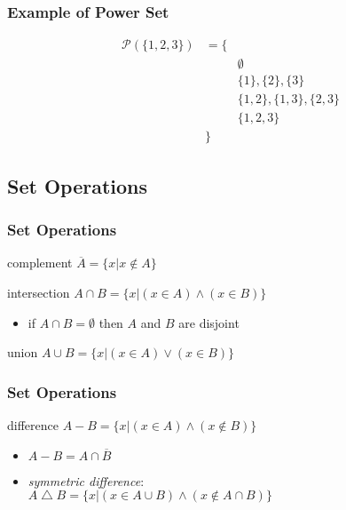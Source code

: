 \documentclass[dvipsnames]{beamer}
\begin{document}
\begin{frame}
  \frametitle{Example of Power Set}

  \begin{example}
    \begin{eqnarray*}
      \mathcal{P}(\{1,2,3\}) & = \{ &\\
                             &      & \emptyset\\
                             &      & \{1\},\{2\},\{3\}\\
                             &      & \{1,2\},\{1,3\},\{2,3\}\\
                             &      & \{1,2,3\}\\
                             &   \} &
    \end{eqnarray*}
  \end{example}
\end{frame}

\subsection{Set Operations}

\begin{frame}
  \frametitle{Set Operations}

  \begin{block}{complement}
    $\overline{A} = \{ x | x \notin A \} $
  \end{block}

  \pause
  \begin{block}{intersection}
    $A \cap B = \{ x | (x \in A) \wedge (x \in B) \}$

    \begin{itemize}
      \item if $A \cap B = \emptyset$ then $A$ and $B$ are \alert{disjoint}
    \end{itemize}
  \end{block}

  \pause
  \begin{block}{union}
    $A \cup B = \{ x | (x \in A) \vee (x \in B) \}$
  \end{block}
\end{frame}

\begin{frame}
  \frametitle{Set Operations}

  \begin{block}{difference}
    $A - B = \{ x | (x \in A) \wedge (x \notin B) \}$

    \pause
    \begin{itemize}
      \item $A-B = A \cap \overline{B}$

      \pause
      \item \emph{symmetric difference}:\\
        $A \bigtriangleup B = \{ x | (x \in A \cup B)
                              \wedge (x \notin A \cap B) \}$
    \end{itemize}
  \end{block}
\end{frame}
\end{document}
